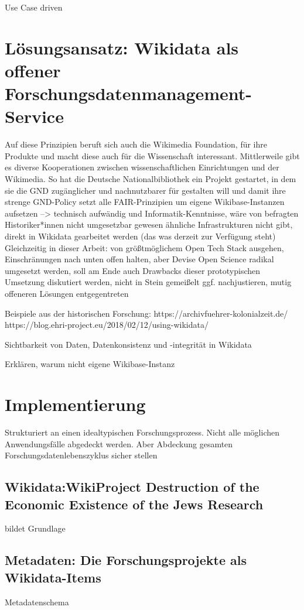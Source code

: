 \onehalfspacing

Use Case driven

\section{Lösungsansatz: Wikidata als offener Forschungsdatenmanagement-Service}
Auf diese Prinzipien beruft sich auch die Wikimedia Foundation, für ihre Produkte und macht diese auch für die Wissenschaft interessant. Mittlerweile gibt es diverse Kooperationen zwischen wissenschaftlichen Einrichtungen und der Wikimedia. So hat die Deutsche Nationalbibliothek ein Projekt gestartet, in dem sie die GND zugänglicher und nachnutzbarer für gestalten will und damit ihre strenge GND-Policy
setzt alle FAIR-Prinzipien um
eigene Wikibase-Instanzen aufsetzen --> technisch aufwändig und Informatik-Kenntnisse, wäre von befragten Historiker*innen nicht umgesetzbar gewesen
ähnliche Infrastrukturen nicht gibt, direkt in Wikidata gearbeitet werden (das was derzeit zur Verfügung steht)
Gleichzeitig in dieser Arbeit: von größtmöglichem Open Tech Stack ausgehen, Einschränungen nach unten offen halten, aber Devise Open Science radikal umgesetzt werden, soll am Ende auch Drawbacks dieser prototypischen Umsetzung diskutiert werden, nicht in Stein gemeißelt ggf. nachjustieren, mutig offeneren Lösungen entgegentreten

Beispiele aus der historischen Forschung:
https://archivfuehrer-kolonialzeit.de/
https://blog.ehri-project.eu/2018/02/12/using-wikidata/


Sichtbarkeit von Daten, Datenkonsistenz und -integrität in Wikidata

Erklären, warum nicht eigene Wikibase-Instanz

\section{Implementierung}

Strukturiert an einen idealtypischen Forschungsprozess. Nicht alle möglichen Anwendungsfälle abgedeckt werden. Aber Abdeckung gesamten Forschungsdatenlebenszyklus sicher stellen

\subsection{Wikidata:WikiProject Destruction of the Economic Existence of the Jews Research}
bildet Grundlage

\subsection{Metadaten: Die Forschungsprojekte als Wikidata-Items}
Metadatenschema

